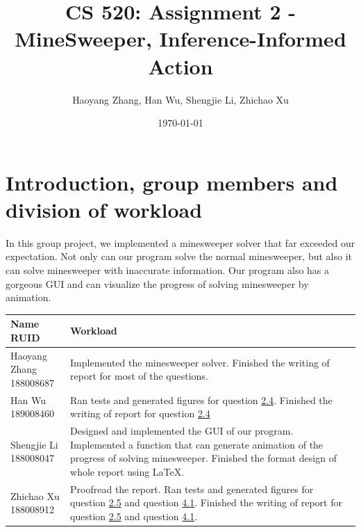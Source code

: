 \documentclass[letter]{article}
\title{CS 520: Assignment 2 - MineSweeper, Inference-Informed Action}
\author{Haoyang Zhang, Han Wu, Shengjie Li, Zhichao Xu}
\date{\today}
\begin{document}
\maketitle

\section{Introduction, group members and division of workload}
\label{sec:Introduction}

In this group project, we implemented a minesweeper solver that far exceeded our expectation. Not only can our program solve the normal minesweeper, but also it can solve minesweeper with inaccurate information. Our program also has a gorgeous GUI and can visualize the progress of solving minesweeper by animation. \\
\begin{tabular}{| p{2.5cm} | p{\textwidth -3.5cm} |}
	\hline
	\makecell[c]{Name \\ RUID} & Workload \\
	\hline
	\makecell[c]{Haoyang Zhang \\ 188008687} & {Implemented the minesweeper solver. Finished the writing of report for most of the questions.} \\
	\hline
	\makecell[c]{Han Wu \\ 189008460} & {Ran tests and generated figures for question \hyperref[han]{2.4}. Finished the writing of report for question \hyperref[han]{2.4}} \\
	\hline
	\makecell[c]{Shengjie Li \\ 188008047} & {Designed and implemented the GUI of our program. Implemented a function that can generate animation of the progress of solving minesweeper. Finished the format design of whole report using \LaTeX. } \\
	\hline
	\makecell[c]{Zhichao Xu \\ 188008912} & {Proofread the report. Ran tests and generated figures for question \hyperref[zhichao1]{2.5} and question \hyperref[zhichao2]{4.1}. Finished the writing of report for question \hyperref[zhichao1]{2.5} and question \hyperref[zhichao2]{4.1}.} \\
	\hline
\end{tabular}
\end{document}
